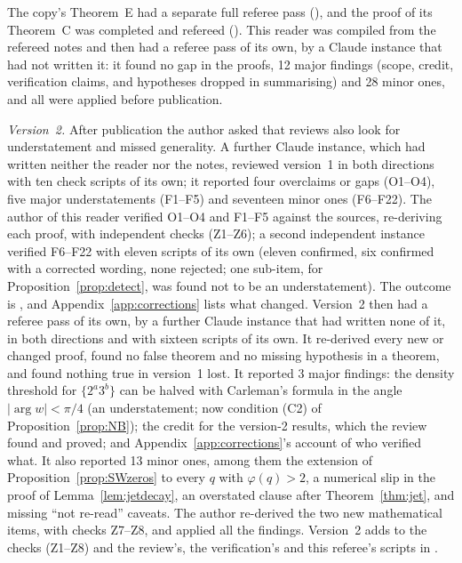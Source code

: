 The copy's Theorem~E had a separate full referee pass (), and the proof of its Theorem~C was completed and refereed (). This reader was compiled from the refereed notes and then had a referee pass of its own, by a Claude instance that had not written it: it found no gap in the proofs, 12 major findings (scope, credit, verification claims, and hypotheses dropped in summarising) and 28 minor ones, and all were applied before publication.

\emph{Version~2.} After publication the author asked that reviews also look for understatement and missed generality. A further Claude instance, which had written neither the reader nor the notes, reviewed version~1 in both directions with ten check scripts of its own; it reported four overclaims or gaps (O1--O4), five major understatements (F1--F5) and seventeen minor ones (F6--F22). The author of this reader verified O1--O4 and F1--F5 against the sources, re-deriving each proof, with independent checks (Z1--Z6); a second independent instance verified F6--F22 with eleven scripts of its own (eleven confirmed, six confirmed with a corrected wording, none rejected; one sub-item, for Proposition~\ref{prop:detect}, was found not to be an understatement). The outcome is , and Appendix~\ref{app:corrections} lists what changed. Version~2 then had a referee pass of its own, by a further Claude instance that had written none of it, in both directions and with sixteen scripts of its own. It re-derived every new or changed proof, found no false theorem and no missing hypothesis in a theorem, and found nothing true in version~1 lost. It reported 3 major findings: the density threshold for $\{2^a3^b\}$ can be halved with Carleman's formula in the angle $|\arg w|<\pi/4$ (an understatement; now condition (C2) of Proposition~\ref{prop:NB}); the credit for the version-2 results, which the review found and proved; and Appendix~\ref{app:corrections}'s account of who verified what. It also reported 13 minor ones, among them the extension of Proposition~\ref{prop:SWzeros} to every $q$ with $\varphi(q)>2$, a numerical slip in the proof of Lemma~\ref{lem:jetdecay}, an overstated clause after Theorem~\ref{thm:jet}, and missing ``not re-read'' caveats. The author re-derived the two new mathematical items, with checks Z7--Z8, and applied all the findings. Version~2 adds to the checks  (Z1--Z8) and the review's, the verification's and this referee's scripts in .

